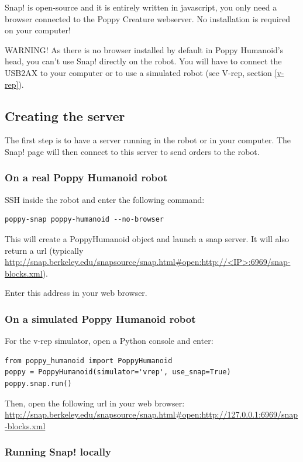 \documentclass{article}
\begin{document}
Snap! is open-source and it is entirely written in javascript, you only need a browser connected to the Poppy Creature webserver. No installation is required on your computer!

WARNING! As there is no browser installed by default in Poppy Humanoid's head, you can't use Snap! directly on the robot. You will have to connect the USB2AX to your computer or to use a simulated robot (see V-rep, section \ref{v-rep}).

\subsection{Creating the server}

The first step is to have a server running in the robot or in your computer. The Snap! page will then connect to this server to send orders to the robot.

\subsubsection{On a real Poppy Humanoid robot}

SSH inside the robot and enter the following command:

\begin{verbatim}
poppy-snap poppy-humanoid --no-browser
\end{verbatim}

This will create a PoppyHumanoid object and launch a snap server. It will also return a url (typically \url{http://snap.berkeley.edu/snapsource/snap.html#open:http://<IP>:6969/snap-blocks.xml}).

Enter this address in your web browser.

\subsubsection{On a simulated Poppy Humanoid robot}

For the v-rep simulator, open a Python console and enter:

\begin{verbatim}
from poppy_humanoid import PoppyHumanoid
poppy = PoppyHumanoid(simulator='vrep', use_snap=True)
poppy.snap.run()
\end{verbatim}

Then, open the following url in your web browser: \url{http://snap.berkeley.edu/snapsource/snap.html#open:http://127.0.0.1:6969/snap-blocks.xml}

\subsubsection{Running Snap! locally}
\end{document}
